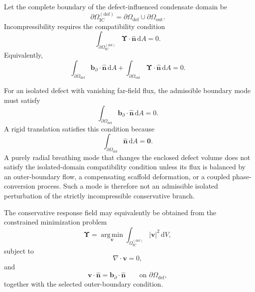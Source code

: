 Let the complete boundary of the defect-influenced condensate domain be
\begin{equation}
    \partial\Omega_{\mathrm{IC}}^{(\mathrm{def})}
    =
    \partial\Omega_{\mathrm{def}}
    \cup
    \partial\Omega_{\mathrm{out}}.
\end{equation}
Incompressibility requires the compatibility condition
\begin{equation}
    \int_{\partial\Omega_{\mathrm{IC}}^{(\mathrm{def})}}
    \boldsymbol\Upsilon\cdot\hat{\mathbf n}\,
    \mathrm dA
    =
    0.
\end{equation}
Equivalently,
\begin{equation}
    \int_{\partial\Omega_{\mathrm{def}}}
    \mathbf b_{\partial}\cdot\hat{\mathbf n}\,
    \mathrm dA
    +
    \int_{\partial\Omega_{\mathrm{out}}}
    \boldsymbol\Upsilon\cdot\hat{\mathbf n}\,
    \mathrm dA
    =
    0.
\end{equation}

For an isolated defect with vanishing far-field flux, the admissible boundary mode must satisfy
\begin{equation}
    \int_{\partial\Omega_{\mathrm{def}}}
    \mathbf b_{\partial}\cdot\hat{\mathbf n}\,
    \mathrm dA
    =
    0.
\end{equation}
A rigid translation satisfies this condition because
\begin{equation}
    \int_{\partial\Omega_{\mathrm{def}}}
    \hat{\mathbf n}\,\mathrm dA
    =
    \mathbf 0.
\end{equation}
A purely radial breathing mode that changes the enclosed defect volume does not satisfy the isolated-domain compatibility condition unless its flux is balanced by an outer-boundary flow, a compensating scaffold deformation, or a coupled phase-conversion process. Such a mode is therefore not an admissible isolated perturbation of the strictly incompressible conservative branch.

The conservative response field may equivalently be obtained from the constrained minimization problem
\begin{equation}
    \boldsymbol\Upsilon
    =
    \operatorname*{arg\,min}_{\mathbf v}
    \int_{\Omega_{\mathrm{IC}}^{(\mathrm{def})}}
    |\mathbf v|^2\,\mathrm dV,
\end{equation}
subject to
\begin{equation}
    \nabla\cdot\mathbf v=0,
\end{equation}
and
\begin{equation}
    \mathbf v\cdot\hat{\mathbf n}
    =
    \mathbf b_{\partial}\cdot\hat{\mathbf n}
    \qquad
    \text{on }
    \partial\Omega_{\mathrm{def}},
\end{equation}
together with the selected outer-boundary condition.

